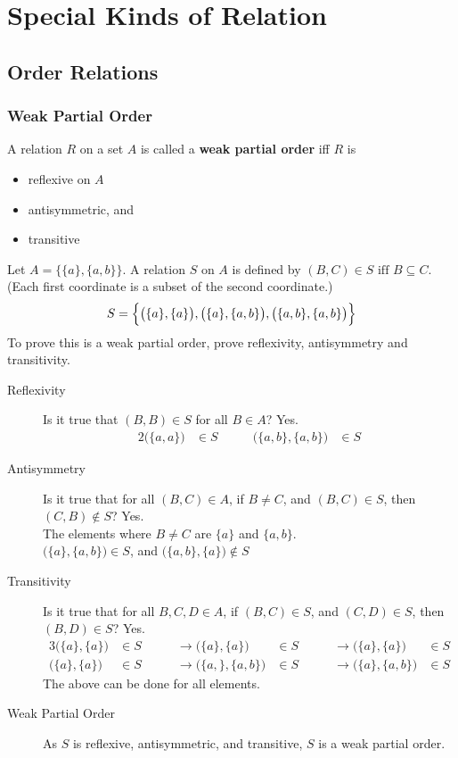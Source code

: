 \documentclass[../notes.tex]{subfiles}
\begin{document}
	\ifSubfilesClassLoaded{\setcounter{chapter}{5}}{}
	\chapter{Special Kinds of Relation}
		\section{Order Relations}
			\subsection{Weak Partial Order}
				A relation $R$ on a set $A$ is called a \textbf{weak partial order} iff $R$ is
				\begin{itemize}[nosep]
					\item reflexive on $A$
					\item antisymmetric, and
					\item transitive
				\end{itemize}
				\begin{example}
					Let $A = \bigl\{\{a\}, \{a, b\}\bigr\}$. A relation $S$ on $A$ is defined by $(B, C) \in S \text{ iff } B \subseteq C$. (Each first coordinate is a subset of the second coordinate.)
					\begin{align*}
						S = \Bigl\{\bigl(\{a\}, \{a\}\bigr), \bigl(\{a\}, \{a, b\}\bigr), \bigl(\{a, b\}, \{a, b\}\bigr)\Bigr\}
					\end{align*}
					To prove this is a weak partial order, prove reflexivity, antisymmetry and transitivity.
					\begin{description}
						\item[Reflexivity] Is it true that $(B, B) \in S$ for all $B \in A$? Yes.
							\begin{alignat*}{2}
								\bigl(\{a, a\}\bigr) &\in S \qquad & \bigl(\{a, b\}, \{a, b\}\bigr) &\in S
							\end{alignat*}
						\item[Antisymmetry] Is it true that for all $(B, C) \in A$, if $B \neq C$, and $(B, C) \in S$, then $(C, B) \notin S$? Yes.\\
							The elements where $B \neq C$ are $\{a\}$ and $\{a, b\}$.\\
							$\bigl(\{a\}, \{a, b\}\bigr) \in S$, and $\bigl(\{a, b\}, \{a\}\bigr) \notin S$
						\item[Transitivity] Is it true that for all $B, C, D \in A$, if $(B, C) \in S$, and $(C, D) \in S$, then $(B, D) \in S$? Yes.
							\begin{alignat*}{3}
								\bigl(\{a\}, \{a\}\bigr) &\in S \qquad &\rightarrow \bigl(\{a\}, \{a\}\bigr) &\in S \qquad &\rightarrow \bigl(\{a\}, \{a\}\bigr) &\in S\\
								\bigl(\{a\}, \{a\}\bigr) &\in S \qquad &\rightarrow \bigl(\{a,\}, \{a, b\}\bigr) &\in S \qquad &\rightarrow \bigl(\{a\}, \{a, b\}\bigr) &\in S
							\end{alignat*}
							The above can be done for all elements.
						\item[Weak Partial Order] As $S$ is reflexive, antisymmetric, and transitive, $S$ is a weak partial order.
					\end{description}
				\end{example}
\end{document}
